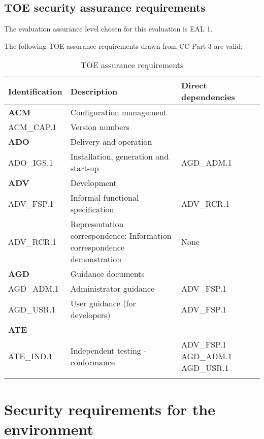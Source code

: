 \documentclass[12pt,english]{scrbook}
\begin{document}



\subsection{TOE security assurance requirements}

The evaluation assurance level chosen for this evaluation is EAL 1.

The following TOE assurance requirements drawn from CC Part 3 are valid:

\begin{longtable}[c]{lp{7cm}p{3cm}}
  \toprule
  Identification & Description & Direct dependencies\\
  \midrule \endhead

  \textbf{ACM} & Configuration management &  \\
  ACM{\_}CAP.1 & Version numbers \\

  \textbf{ADO} & Delivery and operation &  \\
  ADO{\_}IGS.1 & Installation, generation and start-up & AGD{\_}ADM.1 \\
  
  \textbf{ADV} & Development &  \\
  ADV{\_}FSP.1 & Informal functional specification & ADV{\_}RCR.1 \\

  ADV{\_}RCR.1 & Representation correspondence: Information correspondence
  demonstration & None \\

  \textbf{AGD} & Guidance documents &  \\
  AGD{\_}ADM.1 & Administrator guidance & ADV{\_}FSP.1 \\
  AGD{\_}USR.1 & User guidance (for developers) & ADV{\_}FSP.1 \\
  \textbf{ATE} &  &  \\ 
  ATE{\_}IND.1 & Independent testing - conformance & ADV{\_}FSP.1 AGD{\_}ADM.1 AGD{\_}USR.1 \\


  \bottomrule
  \caption{TOE assurance requirements}

\end{longtable}




\section{Security requirements for the environment}
\end{document}

